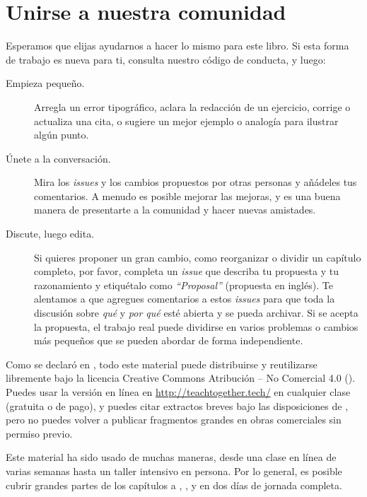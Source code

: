 \chapter{Unirse a nuestra comunidad}\label{s:joining}

Esperamos que elijas ayudarnos a hacer lo mismo para este libro.
Si esta forma de trabajo es nueva para ti,
consulta  nuestro código de conducta,
y luego:

\begin{description}

\item[Empieza pequeño.]
  Arregla un error tipográfico,
  aclara la redacción de un ejercicio,
  corrige o actualiza una cita,
  o sugiere un mejor ejemplo o analogía para ilustrar algún punto.

\item[Únete a la conversación.]
  Mira los \emph{issues} y los cambios propuestos por otras personas
  y añádeles tus comentarios.
  A menudo es posible mejorar las mejoras,
  y es una buena manera de presentarte a la comunidad y hacer nuevas amistades.

\item[Discute, luego edita.]
  Si quieres proponer un gran cambio,
  como reorganizar o dividir un capítulo completo,
  por favor, completa un \emph{issue} que describa tu propuesta y tu razonamiento y etiquétalo como  \emph{``Proposal''} (propuesta en inglés).
  Te alentamos a que agregues comentarios a estos \emph{issues}
  para que toda la discusión sobre \emph{qué} y \emph{por qué} esté abierta y se pueda archivar.
  Si se acepta la propuesta,
  el trabajo real puede dividirse en varios problemas o cambios más pequeños
  que se pueden abordar de forma independiente.
\end{description}


Como se declaró en ,
todo este material puede distribuirse y reutilizarse libremente
bajo la licencia Creative Commons Atribución -- No Comercial 4.0
().
Puedes usar la versión en línea en \url{http://teachtogether.tech/} en cualquier clase (gratuita o de pago),
y puedes citar extractos breves bajo las disposiciones de ,
pero no puedes volver a publicar fragmentos grandes en obras comerciales sin permiso previo.

Este material ha sido usado de muchas maneras,
desde una clase en línea de varias semanas hasta un taller intensivo en persona.
Por lo general, es posible cubrir grandes partes de los capítulos  a ,
,
y  en dos días de jornada completa.

